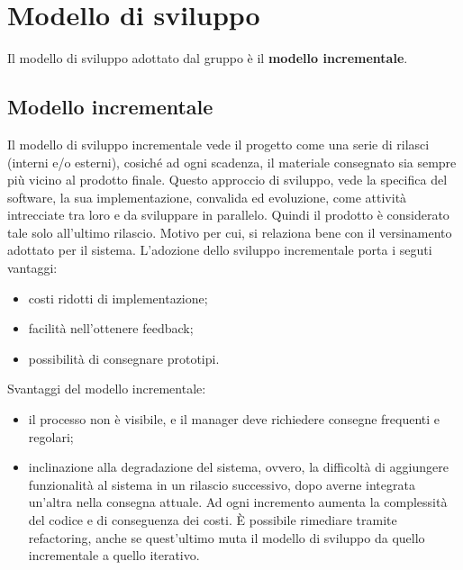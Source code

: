 \section{Modello di sviluppo}
Il modello di sviluppo adottato dal gruppo è il \textbf{modello incrementale}.
\subsection{Modello incrementale}
Il modello di sviluppo incrementale vede il progetto come una serie di rilasci (interni e/o esterni), cosiché ad ogni scadenza, il materiale consegnato sia sempre più vicino al prodotto finale.
Questo approccio di sviluppo, vede la specifica del software, la sua implementazione, convalida ed evoluzione, come attività intrecciate tra loro e da sviluppare in parallelo. Quindi il prodotto è considerato tale solo all'ultimo rilascio. Motivo per cui, si relaziona bene con il versinamento adottato per il sistema.
L'adozione dello sviluppo incrementale porta i seguti vantaggi:
\begin{itemize}
\item costi ridotti di implementazione;
\item facilità nell'ottenere feedback;
\item possibilità di consegnare prototipi.
\end{itemize}
Svantaggi del modello incrementale:
\begin{itemize}
\item il processo non è visibile, e il manager deve richiedere consegne frequenti e regolari;
\item inclinazione alla degradazione del sistema, ovvero, la difficoltà di aggiungere funzionalità al sistema in un rilascio successivo, dopo averne integrata un'altra nella consegna attuale. Ad ogni incremento aumenta la complessità del codice e di conseguenza dei costi. È possibile rimediare tramite refactoring, anche se quest'ultimo muta il modello di sviluppo da quello incrementale a quello iterativo.
\end{itemize}
